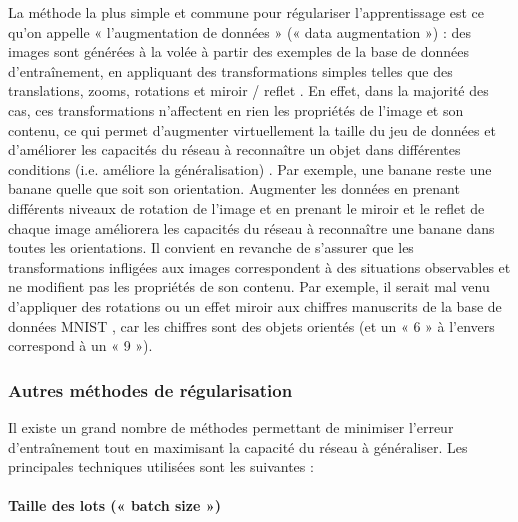La méthode la plus simple et commune pour régulariser l’apprentissage est ce qu’on appelle « l’augmentation de données » (« data augmentation ») : des images sont générées à la volée à partir des exemples de la base de données d’entraînement, en appliquant des transformations simples telles que des translations, zooms, rotations et miroir / reflet \citep{aggarwal_neural_2018}. En effet, dans la majorité des cas, ces transformations n’affectent en rien les propriétés de l’image et son contenu, ce qui permet d’augmenter virtuellement la taille du jeu de données et d’améliorer les capacités du réseau à reconnaître un objet dans différentes conditions (i.e. améliore la généralisation) \citep{wong_understanding_2016}. Par exemple, une banane reste une banane quelle que soit son orientation. Augmenter les données en prenant différents niveaux de rotation de l’image et en prenant le miroir et le reflet de chaque image améliorera les capacités du réseau à reconnaître une banane dans toutes les orientations. Il convient en revanche de s’assurer que les transformations infligées aux images correspondent à des situations observables et ne modifient pas les propriétés de son contenu. Par exemple, il serait mal venu d’appliquer des rotations ou un effet miroir aux chiffres manuscrits de la base de données MNIST \citep{lecun_gradient-based_1998}, car les chiffres sont des objets orientés (et un « 6 » à l’envers correspond à un « 9 »).

\subsubsection{Autres méthodes de régularisation}

Il existe un grand nombre de méthodes permettant de minimiser l’erreur d’entraînement tout en maximisant la capacité du réseau à généraliser. Les principales techniques utilisées sont les suivantes :

\paragraph{Taille des lots (« batch size »)}

